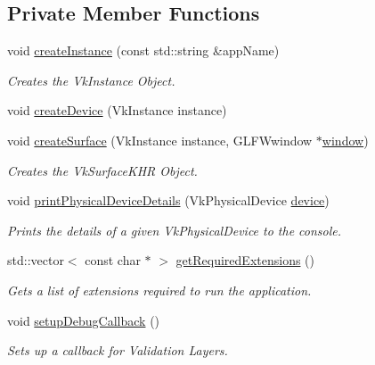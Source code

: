 \subsection*{Private Member Functions}
\begin{DoxyCompactItemize}
\item 
void \mbox{\hyperlink{class_vulkan_context_a8b9ae9353949c8aedae2d83ae26e36b1}{create\+Instance}} (const std\+::string \&app\+Name)
\begin{DoxyCompactList}\small\item\em Creates the Vk\+Instance Object. \end{DoxyCompactList}\item 
void \mbox{\hyperlink{class_vulkan_context_a0eb4e3eb641460f6b02d3d576089e55e}{create\+Device}} (Vk\+Instance instance)
\item 
void \mbox{\hyperlink{class_vulkan_context_add181a467a57654e64f9ae2c6345e107}{create\+Surface}} (Vk\+Instance instance, G\+L\+F\+Wwindow $\ast$\mbox{\hyperlink{class_vulkan_context_ac1c5718ae7cdbcce4dec66cfacc3c7b2}{window}})
\begin{DoxyCompactList}\small\item\em Creates the Vk\+Surface\+K\+HR Object. \end{DoxyCompactList}\item 
void \mbox{\hyperlink{class_vulkan_context_a7f95badc58b644fcc0869e94e2bf6cc0}{print\+Physical\+Device\+Details}} (Vk\+Physical\+Device \mbox{\hyperlink{class_vulkan_context_a6354038513569b86a28a70974d3520ac}{device}})
\begin{DoxyCompactList}\small\item\em Prints the details of a given Vk\+Physical\+Device to the console. \end{DoxyCompactList}\item 
\mbox{\label{class_vulkan_context_a2a2d18c0abe52420f8f1e6f72af863b3}} 
std\+::vector$<$ const char $\ast$ $>$ \mbox{\hyperlink{class_vulkan_context_a2a2d18c0abe52420f8f1e6f72af863b3}{get\+Required\+Extensions}} ()
\begin{DoxyCompactList}\small\item\em Gets a list of extensions required to run the application. \end{DoxyCompactList}\item 
\mbox{\label{class_vulkan_context_aabb49cfd50da21000ad68ee9b480f80a}} 
void \mbox{\hyperlink{class_vulkan_context_aabb49cfd50da21000ad68ee9b480f80a}{setup\+Debug\+Callback}} ()
\begin{DoxyCompactList}\small\item\em Sets up a callback for Validation Layers. \end{DoxyCompactList}\end{DoxyCompactItemize}
